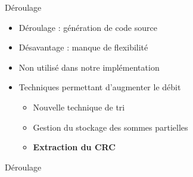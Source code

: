 \documentclass[t,compress,mathserif,12pt,xcolor=dvipsnames]{beamer}
\begin{document}
\begin{frame}[c]{Déroulage}
\begin{itemize}
	\item Déroulage : génération de code source
	\item Désavantage : manque de flexibilité
	\item Non utilisé dans notre implémentation
	\item Techniques permettant d'augmenter le débit
	\begin{itemize}
		\item Nouvelle technique de tri
		\item Gestion du stockage des sommes partielles
		\item \textbf{Extraction du CRC}
	\end{itemize}
\end{itemize}
\end{frame}

\begin{frame}[c]{Déroulage}
	\centering
\end{frame}
\end{document}
